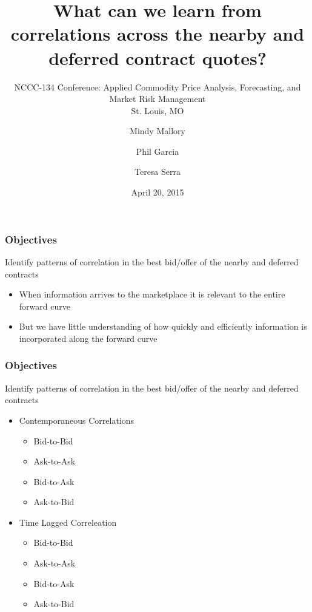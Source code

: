 \documentclass[t]{beamer}
\title[Nearby and Deferred Quotes]{What can we learn from correlations across the nearby and deferred contract quotes?\\}
\subtitle{NCCC-134 Conference: Applied Commodity Price Analysis, Forecasting, and Market Risk Management\\ St. Louis, MO}
\author{
  Mindy Mallory\inst{1} 
  \and 
  Phil Garcia\inst{1} 
  \and 
  Teresa Serra\inst{1}
  }
\institute{
  \inst{1}Department of Agricultural and Consumer Economics\\
  University of Illinois\\
  \url{mallorym@illinois.edu}
}
\date{April 20, 2015}
\begin{document}
\begin{frame}{}
  \titlepage
\end{frame}
\begin{frame}
\frametitle{Objectives}
  Identify patterns of correlation in the best bid/offer of the nearby and deferred contracts
  \begin{itemize}

    \item When information arrives to the marketplace it is relevant to the entire forward curve
    \item But we have little understanding of how quickly and efficiently information is incorporated along the forward curve
    \end{itemize}

\end{frame}
\begin{frame}
\frametitle{Objectives}
  Identify patterns of correlation in the best bid/offer of the nearby and deferred contracts
  \begin{itemize}
 \item Contemporaneous Correlations
  \begin{itemize}
    \item Bid-to-Bid
    \item Ask-to-Ask
    \item Bid-to-Ask
    \item Ask-to-Bid  
    \end{itemize}
  \item Time Lagged Correleation
     \begin{itemize}
    \item Bid-to-Bid
    \item Ask-to-Ask
    \item Bid-to-Ask
    \item Ask-to-Bid
    \end{itemize}
    
    \end{itemize}

\end{frame}
\end{document}
